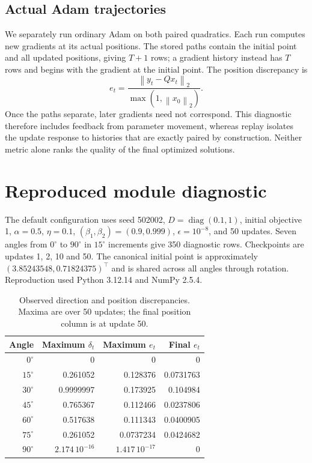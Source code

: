 \documentclass[11pt,a4paper]{article}
\newcommand{\norm}[1]{\left\lVert#1\right\rVert}
\begin{document}
\subsection{Actual Adam trajectories}
We separately run ordinary Adam on both paired quadratics. Each run computes
new gradients at its actual positions. The stored paths contain the initial
point and all updated positions, giving $T+1$ rows; a gradient history instead
has $T$ rows and begins with the gradient at the initial point.
The position discrepancy is
\begin{equation}
 e_t=\frac{\norm{y_t-Qx_t}_2}{\max(1,\norm{x_0}_2)}.
 \label{eq:position}
\end{equation}
Once the paths separate, later gradients need not correspond. This diagnostic
therefore includes feedback from parameter movement, whereas replay isolates
the update response to histories that are exactly paired by construction.
Neither metric alone ranks the quality of the final optimized solutions.

\section{Reproduced module diagnostic}
The default configuration uses seed 502002,
$D=\operatorname{diag}(0.1,1)$, initial objective 1,
$\alpha=0.5$, $\eta=0.1$, $(\beta_1,\beta_2)=(0.9,0.999)$,
$\epsilon=10^{-8}$, and 50 updates. Seven angles from $0^\circ$ to
$90^\circ$ in $15^\circ$ increments give 350 diagnostic rows. Checkpoints
are updates 1, 2, 10 and 50. The canonical initial point is approximately
$(3.85243548,0.71824375)^\top$ and is shared across all angles through
rotation. Reproduction used Python 3.12.14 and NumPy 2.5.4.

\begin{table}[htbp]
\centering
\caption{Observed direction and position discrepancies. Maxima are over
50 updates; the final position column is at update 50.}
\label{tab:results}
\begin{tabular}{rrrr}
\toprule
Angle & Maximum $\delta_t$ & Maximum $e_t$ & Final $e_t$\\
\midrule
$0^\circ$  & 0 & 0 & 0\\
$15^\circ$ & 0.261052 & 0.128376 & 0.0731763\\
$30^\circ$ & 0.9999997 & 0.173925 & 0.104984\\
$45^\circ$ & 0.765367 & 0.112466 & 0.0237806\\
$60^\circ$ & 0.517638 & 0.111343 & 0.0400905\\
$75^\circ$ & 0.261052 & 0.0737234 & 0.0424682\\
$90^\circ$ & $2.174\,10^{-16}$ & $1.417\,10^{-17}$ & 0\\
\bottomrule
\end{tabular}
\end{table}
\end{document}
